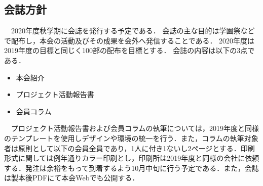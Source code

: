 \subsection*{会誌方針}
　2020年度秋学期に会誌を発行する予定である．
会誌の主な目的は学園祭などで配布し，本会の活動及びその成果を会外へ発信することである．
2020年度は2019年度の目標と同じく100部の配布を目標とする．
会誌の内容は以下の3点である．
\begin{itemize}
\item 本会紹介
\item プロジェクト活動報告書
\item 会員コラム
\end{itemize}
　プロジェクト活動報告書および会員コラムの執筆については，2019年度と同様のテンプレートを使用しデザインや環境の統一を行う．また，コラムの執筆対象者は原則として\thirdGrade{}以下の会員全員であり，1人に付き1ないし2ページとする．印刷形式に関しては例年通りカラー印刷とし，印刷所は2019年度と同様の会社に依頼する．発注は余裕をもって到着するよう10月中旬に行う予定である．また，会誌は製本後PDFにて本会Webでも公開する．

